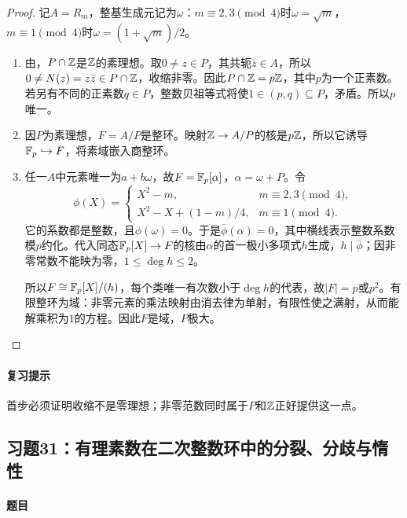 \begin{proof}

记$A=R_m$，整基生成元记为$\omega$：$m\equiv2,3\pmod4$时$\omega=\sqrt m$，$m\equiv1\pmod4$时$\omega=(1+\sqrt m)/2$。
\begin{enumerate}[label=(\roman*)]
\item 由，$P\cap\mathbb Z$是$\mathbb Z$的素理想。取$0\ne z\in P$，其共轭$\bar z\in A$，所以$0\ne N(z)=z\bar z\in P\cap\mathbb Z$，收缩非零。因此$P\cap\mathbb Z=p\mathbb Z$，其中$p$为一个正素数。若另有不同的正素数$q\in P$，整数贝祖等式将使$1\in(p,q)\subseteq P$，矛盾。所以$p$唯一。
\item 因$P$为素理想，$F=A/P$是整环。映射$\mathbb Z\to A/P$的核是$p\mathbb Z$，所以它诱导$\mathbb F_p\hookrightarrow F$，将素域嵌入商整环。
\item 任一$A$中元素唯一为$a+b\omega$，故$F=\mathbb F_p[\alpha]$，$\alpha=\omega+P$。令
\[
\phi(X)=\begin{cases}
X^2-m,&m\equiv2,3\pmod4,\\
X^2-X+(1-m)/4,&m\equiv1\pmod4.
\end{cases}
\]
它的系数都是整数，且$\phi(\omega)=0$。于是$\bar\phi(\alpha)=0$，其中横线表示整数系数模$p$约化。代入同态$\mathbb F_p[X]\to F$的核由$\alpha$的首一极小多项式$h$生成，$h\mid\bar\phi$；因非零常数不能映为零，$1\le\deg h\le2$。

所以$F\cong\mathbb F_p[X]/(h)$，每个类唯一有次数小于$\deg h$的代表，故$|F|=p$或$p^2$。有限整环为域：非零元素的乘法映射由消去律为单射，有限性使之满射，从而能解乘积为$1$的方程。因此$F$是域，$P$极大。
\end{enumerate}

\end{proof}

\paragraph{复习提示}

首步必须证明收缩不是零理想；非零范数同时属于$P$和$\mathbb Z$正好提供这一点。

\subsection{习题31：有理素数在二次整数环中的分裂、分歧与惰性}

\label{ex:4:31}

\paragraph{题目}

